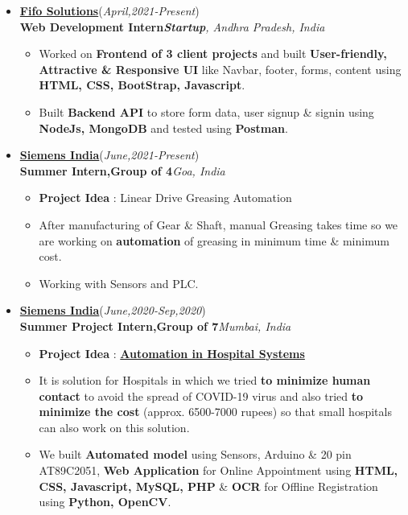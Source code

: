\documentclass[10pt]{extarticle}
\begin{document}
\begin{itemize}
\item \href{https://www.linkedin.com/company/fifo-solutions/}{\textbf{Fifo Solutions}}\hfill\hfill(\textit{April,2021-Present})\\
\textbf{Web Development Intern}\hfill\hfill\textit{\textbf{Startup}, Andhra Pradesh, India}
    \begin{itemize}
        \item Worked on \textbf{Frontend of 3 client projects} and built \textbf{User-friendly, Attractive \& Responsive UI} like Navbar, footer, forms, content using \textbf{HTML, CSS, BootStrap, Javascript}.
        \item Built \textbf{Backend API} to store form data, user signup \& signin using \textbf{NodeJs, MongoDB} and tested using \textbf{Postman}.
    \end{itemize}
\item \href{http://www.siemens.com/}{\textbf{Siemens India}}\hfill\hfill(\textit{June,2021-Present})\\
\textbf{Summer Intern,Group of 4}\hfill\hfill\textit{Goa, India}
     \begin{itemize}
         \item \textbf{Project Idea} : Linear Drive Greasing Automation
         \item After manufacturing of Gear \& Shaft, manual Greasing takes time so we are working on \textbf{automation} of greasing in minimum time \& minimum cost.
         \item Working with Sensors and PLC.
     \end{itemize}
\item \href{http://www.siemens.com/}{\textbf{Siemens India}}\hfill\hfill(\textit{June,2020-Sep,2020})\\
\textbf{Summer Project Intern,Group of 7}\hfill\hfill\textit{Mumbai, India}
      \begin{itemize}
          \item \textbf{Project Idea} : \href{https://github.com/PSoni8/Automation-in-Hospital-Systems}{\textbf{Automation in Hospital Systems}}
          \item It is solution for Hospitals in which we tried \textbf{to minimize human contact} to avoid the spread of COVID-19 virus and also tried \textbf{to minimize the cost} (approx. 6500-7000 rupees) so that small hospitals can also work on this solution.
          \item We built \textbf{Automated model} using Sensors, Arduino \& 20 pin AT89C2051, \textbf{Web Application} for Online Appointment using \textbf{ HTML, CSS, Javascript, MySQL, PHP} \& \textbf{OCR} for Offline Registration using \textbf{Python, OpenCV}.
      \end{itemize}
\end{itemize}
\end{document}
